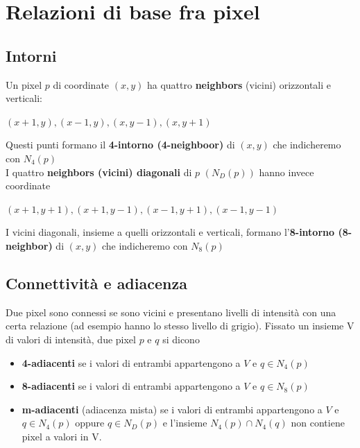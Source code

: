 \section{Relazioni di base fra pixel}

\subsection{Intorni}

Un pixel $p$ di coordinate $(x,y)$ ha quattro \textbf{neighbors} (vicini) orizzontali e verticali:

\begin{center}
    $(x+1, y), (x-1, y), (x, y-1), (x, y+1)$
\end{center}

Questi punti formano il \textbf{4-intorno (4-neighboor)} di $(x,y)$ che indicheremo con $N_4(p)$
\\I quattro \textbf{neighbors (vicini) diagonali} di $p$ $(N_D(p))$ hanno invece coordinate

\begin{center}
    $(x+1, y+1), (x+1,y-1), (x-1, y+1), (x-1, y-1)$
\end{center}

I vicini diagonali, insieme a quelli orizzontali e verticali, formano l'\textbf{8-intorno (8-neighbor)} di $(x,y)$  che indicheremo con $N_8(p)$

\subsection{Connettività e adiacenza}

Due pixel sono connessi se sono vicini e presentano livelli di intensità con una certa relazione (ad esempio hanno lo stesso livello di grigio).
Fissato un insieme V di valori di intensità, due pixel $p$ e $q$ si dicono

\begin{itemize}
    \item \textbf{4-adiacenti} se i valori di entrambi appartengono a $V$ e $q \in N_4(p)$
    \item \textbf{8-adiacenti} se i valori di entrambi appartengono a $V$ e $q \in N_8(p)$
    \item \textbf{m-adiacenti} (adiacenza mista) se i valori di entrambi appartengono a $V$ e $q \in N_4(p)$ oppure $q \in N_D(p)$ e l'insieme $N_4(p) \cap N_4(q)$ non contiene pixel a valori in V.
\end{itemize}


